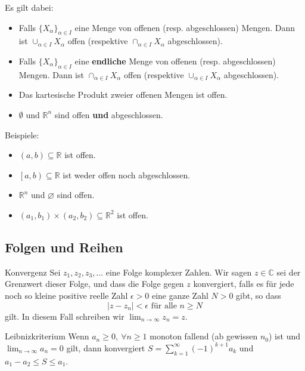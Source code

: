 \documentclass[a4paper,10pt]{article}
\def\limn{\lim_{n\to \infty}}
\def\sumk{\sum_{k=1}^\infty}
\def\R{\mathbb{R}}
\begin{document}
Es gilt dabei:

\begin{itemize}
  \item Falls $\{X_\alpha\}_{\alpha \in I}$ eine Menge von offenen (resp. abgeschlossen) Mengen. Dann ist $\cup_{\alpha \in I} X_\alpha$ offen (respektive $\cap_{\alpha \in I} X_\alpha$ abgeschlossen).
  \item Falls $\{X_\alpha\}_{\alpha \in I}$ eine \textbf{endliche} Menge von offenen (resp. abgeschlossen) Mengen. Dann ist $\cap_{\alpha \in I} X_\alpha$ offen (respektive $\cup_{\alpha \in I} X_\alpha$ abgeschlossen).
  \item Das kartesische Produkt zweier offenen Mengen ist offen.
  \item $\emptyset$ und $\R^n$ sind offen \textbf{und} abgeschlossen.
\end{itemize}

Beispiele:
\begin{itemize}
  \item \((a,b) \subseteq \R\) ist offen.
  \item \(\left[a,b\right) \subseteq \R\) ist weder offen noch abgeschlossen.
  \item \(\R^n\) und \(\varnothing\) sind offen.
  \item \((a_1, b_1) \times (a_2,b_2) \subseteq \R^2\) ist offen.
\end{itemize}

\subsection{Folgen und Reihen}

\begin{mainbox}{Konvergenz}
  Sei \(z_1,z_2,z_3,\ldots\) eine Folge komplexer Zahlen. Wir sagen \(z \in \mathbb{C}\) sei der Grenzwert dieser Folge, und dass die Folge gegen \(z\) konvergiert, falls es für jede noch so kleine positive reelle Zahl \(\epsilon>0\) eine ganze Zahl \(N>0\) gibt, so dass \[|z-z_n|<\epsilon \text{ für alle } n\geq N \] gilt. In diesem Fall schreiben wir \(\displaystyle\lim_{n\to\infty}z_n=z\).
\end{mainbox}

\begin{subbox}{Leibnizkriterium}
Wenn $a_n \ge 0, \ \forall n \ge 1$ monoton fallend (ab gewissen $n_0$) ist und $\limn a_n = 0$ gilt, dann konvergiert $S = \sumk (-1)^{k+1} a_k$ und $a_1 - a_2 \le S \le a_1$.
\end{subbox}
\end{document}
